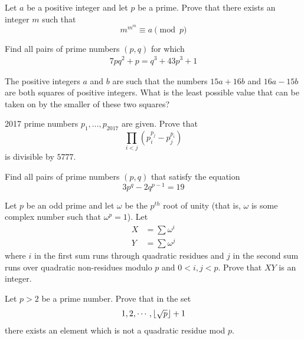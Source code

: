 \begin{problem}[ELMO 2000] %
	Let $a$ be a positive integer and let $p$ be a prime. Prove that there exists an integer $m$ such that \[ m^{m^m} \equiv a \pmod p\]
\end{problem}

\begin{problem} %
	Find all pairs of prime numbers $(p,q)$ for which
	\begin{align*}
	7pq^2 + p = q^3 + 43p^3 + 1
	\end{align*}
\end{problem}

\begin{problem} [IMO 1996] %
	The positive integers $ a$ and $ b$ are such that the numbers $ 15a + 16b$ and $ 16a - 15b$ are both squares of positive integers. What is the least possible value that can be taken on by the smaller of these two squares?
\end{problem}

\begin{problem} %
	2017 prime numbers $p_1,\ldots,p_{2017}$ are given. Prove that $$\prod_{i<j} (p_i^{p_j}-p_j^{p_i})$$ is divisible by $5777$.
\end{problem}

\begin{problem}[Ukraine 2014] %
	Find all pairs of prime numbers $(p,q)$ that satisfy the equation $$3p^{q}-2q^{p-1}=19$$
\end{problem}

\begin{problem} %
	Let $p$ be an odd prime and let $\omega$ be the $p^{th}$ root of unity (that is, $\omega$ is some complex number such that $\omega^p = 1$). Let
		\begin{align*}
			X
				& =\sum \omega^i\\
			Y
				& =\sum \omega^j
		\end{align*}
	where $i$ in the first sum runs through quadratic residues and $j$ in the second sum runs over quadratic non-residues modulo $p$ and $0<i,j<p$. Prove that $XY$ is an integer.
\end{problem}

\begin{problem} %
	Let $p>2$ be a prime number. Prove that in the set
		\begin{align*}
			1,2, \cdots ,\left\lfloor{\sqrt{p}}\right\rfloor+1
		\end{align*}
	there exists an element which is not a quadratic residue mod $p$.
\end{problem}


